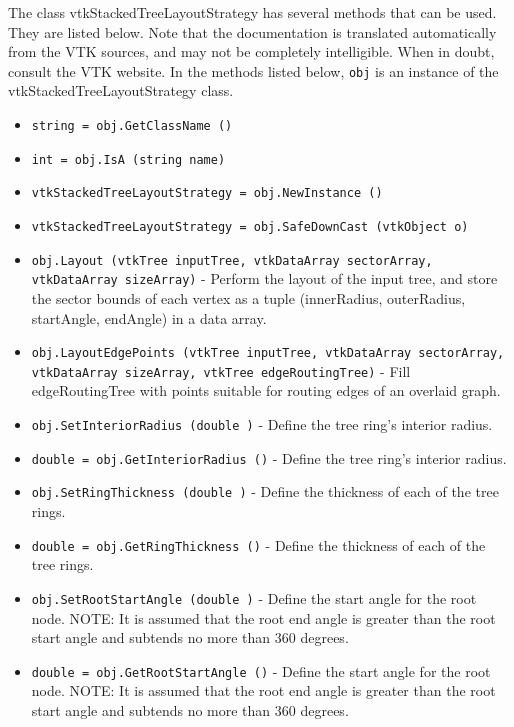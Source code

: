 The class vtkStackedTreeLayoutStrategy has several methods that can be used.
  They are listed below.
Note that the documentation is translated automatically from the VTK sources,
and may not be completely intelligible.  When in doubt, consult the VTK website.
In the methods listed below, \verb|obj| is an instance of the vtkStackedTreeLayoutStrategy class.
\begin{itemize}
\item  \verb|string = obj.GetClassName ()|

\item  \verb|int = obj.IsA (string name)|

\item  \verb|vtkStackedTreeLayoutStrategy = obj.NewInstance ()|

\item  \verb|vtkStackedTreeLayoutStrategy = obj.SafeDownCast (vtkObject o)|

\item  \verb|obj.Layout (vtkTree inputTree, vtkDataArray sectorArray, vtkDataArray sizeArray)| -  Perform the layout of the input tree, and store the sector
 bounds of each vertex as a tuple
 (innerRadius, outerRadius, startAngle, endAngle)
 in a data array.

\item  \verb|obj.LayoutEdgePoints (vtkTree inputTree, vtkDataArray sectorArray, vtkDataArray sizeArray, vtkTree edgeRoutingTree)| -  Fill edgeRoutingTree with points suitable for routing edges of
 an overlaid graph.

\item  \verb|obj.SetInteriorRadius (double )| -  Define the tree ring's interior radius.

\item  \verb|double = obj.GetInteriorRadius ()| -  Define the tree ring's interior radius.

\item  \verb|obj.SetRingThickness (double )| -  Define the thickness of each of the tree rings.

\item  \verb|double = obj.GetRingThickness ()| -  Define the thickness of each of the tree rings.

\item  \verb|obj.SetRootStartAngle (double )| -  Define the start angle for the root node.
 NOTE: It is assumed that the root end angle is greater than the
 root start angle and subtends no more than 360 degrees.

\item  \verb|double = obj.GetRootStartAngle ()| -  Define the start angle for the root node.
 NOTE: It is assumed that the root end angle is greater than the
 root start angle and subtends no more than 360 degrees.


\end{itemize}

